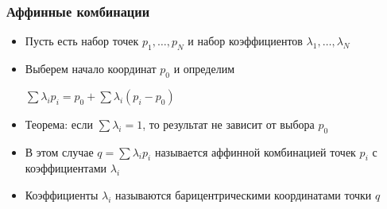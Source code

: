 \documentclass{beamer}
\begin{document}
\begin{frame}[fragile]
\frametitle{Аффинные комбинации}
\begin{itemize}
\item Пусть есть набор точек \begin{math}p_1, \dots, p_N\end{math} и набор коэффициентов \begin{math}\lambda_1, \dots, \lambda_N\end{math}
\pause
\item Выберем начало координат \begin{math}p_0\end{math} и определим

\begin{math}\sum \lambda_i p_i = p_0 + \sum \lambda_i (p_i - p_0) \end{math}
\pause
\item Теорема: если \begin{math}\sum \lambda_i = 1\end{math}, то результат не зависит от выбора \begin{math}p_0\end{math}
\pause
\item В этом случае \begin{math}q = \sum \lambda_i p_i\end{math} называется аффинной комбинацией точек \begin{math}p_i\end{math} с коэффициентами \begin{math}\lambda_i\end{math}
\pause
\item Коэффициенты \begin{math}\lambda_i\end{math} называются барицентрическими координатами точки \begin{math}q\end{math}
\end{itemize}
\end{frame}
\end{document}
